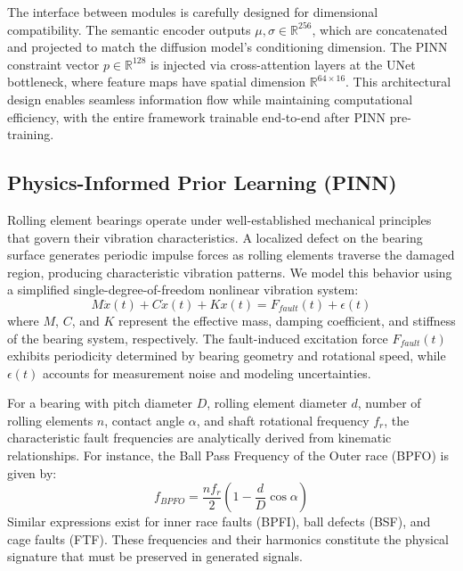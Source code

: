 \documentclass[journal]{IEEEtran}
\begin{document}
The interface between modules is carefully designed for dimensional compatibility. The semantic encoder outputs $\mu, \sigma \in \mathbb{R}^{256}$, which are concatenated and projected to match the diffusion model's conditioning dimension. The PINN constraint vector $p \in \mathbb{R}^{128}$ is injected via cross-attention layers at the UNet bottleneck, where feature maps have spatial dimension $\mathbb{R}^{64 \times 16}$. This architectural design enables seamless information flow while maintaining computational efficiency, with the entire framework trainable end-to-end after PINN pre-training.


\subsection{Physics-Informed Prior Learning (PINN)}
Rolling element bearings operate under well-established mechanical principles that govern their vibration characteristics. A localized defect on the bearing surface generates periodic impulse forces as rolling elements traverse the damaged region, producing characteristic vibration patterns. We model this behavior using a simplified single-degree-of-freedom nonlinear vibration system:
\begin{equation}
    M \ddot{x}(t) + C \dot{x}(t) + K x(t) = F_{fault}(t) + \epsilon(t)
    \label{eq:vibration_dynamics}
\end{equation}
where $M$, $C$, and $K$ represent the effective mass, damping coefficient, and stiffness of the bearing system, respectively. The fault-induced excitation force $F_{fault}(t)$ exhibits periodicity determined by bearing geometry and rotational speed, while $\epsilon(t)$ accounts for measurement noise and modeling uncertainties.

For a bearing with pitch diameter $D$, rolling element diameter $d$, number of rolling elements $n$, contact angle $\alpha$, and shaft rotational frequency $f_r$, the characteristic fault frequencies are analytically derived from kinematic relationships. For instance, the Ball Pass Frequency of the Outer race (BPFO) is given by:
\begin{equation}
    f_{BPFO} = \frac{n f_r}{2} \left(1 - \frac{d}{D} \cos \alpha \right)
    \label{eq:bpfo}
\end{equation}
Similar expressions exist for inner race faults (BPFI), ball defects (BSF), and cage faults (FTF). These frequencies and their harmonics constitute the physical signature that must be preserved in generated signals.
\end{document}
